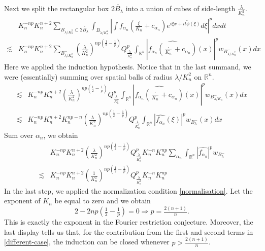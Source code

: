 \documentclass[12pt,leqno]{amsart}
\def\R{\mathbb{R}}
\def\lesim{\lesssim}
\theoremstyle{plain}
\numberwithin{equation}{section}
\begin{document}
Next we split the rectangular box $2\widetilde{B_{\lambda}}$ into a union of cubes of side-length $\frac{\lambda}{K_n^{2}}$.
\[
\begin{split}
& K_n^{-np}K_n^{n+2}\sum_{B_{\lambda/K_n^{2}}\subset 2\widetilde{B_{\lambda}}}\int_{B_{\lambda/K_n^{2}}} \left|\int f_{\alpha_n}(\tfrac{\xi}{K_n}+c_{\alpha_n})e^{i\xi x+it \widetilde{\phi}(\xi)}d\xi\right|^p dxdt\\
 \lesim & K_n^{-np}K_n^{n+2}  \sum_{B^-_{\lambda/K_n^{2}}} \left(\frac{\lambda}{K_n^{2}}\right)^{np(\tfrac{1}{2}-\frac{1}{p})} Q_{\tfrac{\lambda}{K_n^{2}}}^p \int_{\R^n} \left|\widehat{f_{\alpha_n}(\tfrac{\cdot}{K_n}+c_{\alpha_n})} (x)\right|^p w_{B^-_{\lambda/K_n^2}}(x)dx
\end{split}
\]
Here we applied the induction hypothesis. Notice that in the last summand, we were (essentially) summing over spatial balls of radius $\lambda/K_n^{2}$ on $\R^n$.
\[
\begin{split}
\lesim & K_n^{-np}K_n^{n+2} \left(\frac{\lambda}{K_n^{2}}\right)^{np(\frac{1}{2}-\frac{1}{p})} Q_{\tfrac{\lambda}{K_n^{2}}}^p \int_{\R^n} \left|\widehat{f_{\alpha_n}(\tfrac{\cdot}{K_n}+c_{\alpha_n})} (x)\right|^p w_{B^-_{\lambda/K_n}}(x) dx\\
\lesim & K_n^{-np}K_n^{n+2} K_n^{np-n} \left(\frac{\lambda}{K_n^{2}}\right)^{np(\frac{1}{2}-\frac{1}{p})} Q_{\frac{\lambda}{K_n^{2}}}^p \int_{\R^n} \left|\widehat{f_{\alpha_n}} (\xi)\right|^p w_{B^-_{\lambda}}(x) dx
\end{split}
\]
Sum over $\alpha_n$, we obtain 
\[
\begin{split}
& K_n^{-np} K_n^{n+2} \left(\frac{\lambda}{K_n^{2}}\right)^{np(\frac{1}{2}-\frac{1}{p})} Q^p_{\frac{\lambda}{K_n^{2}}} K_n^{-n} K_n^{np} \sum_{\alpha_n} \int_{\R^n} |\widehat{f_{\alpha_n}}|^p w_{B^-_{\lambda}}\\
\lesim & K_n^{-np} K_n^{n+2} \left(\frac{1}{K_n^{2}}\right)^{np(\frac{1}{2}-\frac{1}{p})} Q^p_{\frac{\lambda}{K_n^{2}}} K_n^{-n} K_n^{np} 
\end{split}
\]
In the last step, we applied the normalization condition \eqref{normalisation}. Let the exponent of $K_n$ be equal to zero and we obtain 
\[
2-2np(\tfrac{1}{2}-\tfrac{1}{p})=0\Rightarrow p= \tfrac{2(n+1)}{n}.
\]
This is exactly the exponent in the Fourier restriction conjecture. Moreover, the last display tells us that, for the contribution from the first and second terms in \eqref{different-case}, the induction can be closed whenever $p> \frac{2(n+1)}{n}$. \\
\end{document}
